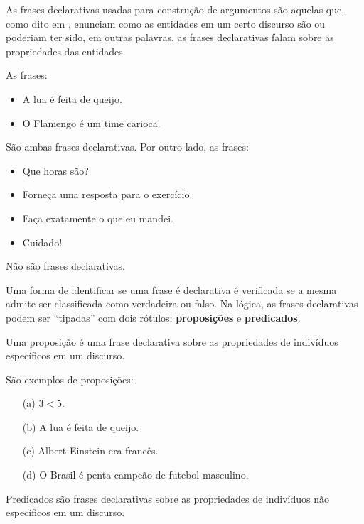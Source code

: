 As frases declarativas usadas para construção de argumentos são aquelas que, como dito em \cite{joaoPavao2014}, enunciam como as entidades em um certo discurso são ou poderiam ter sido, em outras palavras, as frases declarativas falam sobre as propriedades das entidades.

\begin{exemplo}\label{exe:FrasesDeclarativas}
	As frases:
	\begin{itemize}
		\item A lua é feita de queijo.
		\item O Flamengo é um time carioca.
	\end{itemize}
	São ambas frases declarativas. Por outro lado, as frases:
	\begin{itemize}
		\item Que horas são?
		\item Forneça uma resposta para o exercício.
		\item Faça exatamente o que eu mandei.
		\item Cuidado!
	\end{itemize}
	Não são frases declarativas.
\end{exemplo}

Uma forma de identificar se uma frase é declarativa é verificada se a mesma admite ser classificada como verdadeira ou falso. Na lógica, as frases declarativas podem ser ``tipadas'' com dois rótulos: \textbf{proposições} e \textbf{predicados}.

\begin{definicao}[Proposição]\label{def:Proposicao}
	Uma proposição é uma frase declarativa sobre as propriedades de indivíduos específicos em um discurso.
\end{definicao}

\begin{exemplo}\label{exe:Proposicoes}
	São exemplos de proposições:
	\begin{itemize}
		\item[(a)] $3 < 5$.
		\item[(b)] A lua é feita de queijo.
		\item[(c)] Albert Einstein era francês.
		\item[(d)] O Brasil é penta campeão de futebol masculino.
	\end{itemize}
\end{exemplo}

\begin{definicao}[Predicados]\label{def:Predicados}
	Predicados são frases declarativas sobre as propriedades de indivíduos não específicos em um discurso.
\end{definicao}

